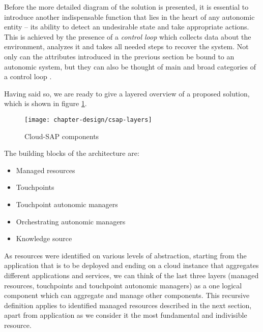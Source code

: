 Before the more detailed diagram of the solution is presented, it is essential to introduce another indispensable function that lies in the heart of any autonomic entity -- its ability to detect an undesirable state and take appropriate actions. This is achieved by the presence of a \emph{control loop} which collects data about the environment, analyzes it and takes all needed steps to recover the system. Not only can the attributes introduced in the previous section be bound to an autonomic system, but they can also be thought of main and broad categories of a control loop \cite{IBM06}.

Having said so, we are ready to give a layered overview of a proposed solution, which is shown in figure \ref{img:csap-layered-structure}.
\begin{figure}[!ht]
  \begin{center}
    \texttt{[image: chapter-design/csap-layers]}
  \end{center}
  \caption{Cloud-SAP components}
  \label{img:csap-layered-structure}
\end{figure}

The building blocks of the architecture are:
\begin{itemize}
  \item Managed resources
  \item Touchpoints
  \item Touchpoint autonomic managers
  \item Orchestrating autonomic managers
  \item Knowledge source
\end{itemize}
As resources were identified on various levels of abstraction, starting from the application that is to be deployed and ending on a cloud instance that aggregates different applications and services, we can think of the last three layers (managed resources, touchpoints and touchpoint autonomic managers) as a one logical component which can aggregate and manage other components. This recursive definition applies to identified managed resources described in the next section, apart from application as we consider it the most fundamental and indivisible resource.

